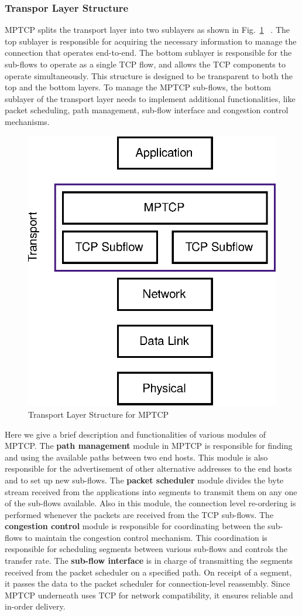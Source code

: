 \subsubsection{Transpor Layer Structure}

MPTCP splits the transport layer into two sublayers as shown in Fig.~\ref{fig:TransportLayerStructure} ~\cite{barreia2014multipath}. The top sublayer is responsible for acquiring the necessary information to manage the connection that operates end-to-end. The bottom sublayer is responsible for the sub-flows to operate as a single TCP flow, and allows the TCP components to operate simultaneously. This structure is designed to be transparent to both the top and the bottom layers. To manage the MPTCP sub-flows, the bottom sublayer of the transport layer needs to implement additional functionalities, like packet scheduling, path management, sub-flow interface and congestion control mechanisms.

\begin{figure}[!ht]
    \centering
    \includegraphics[width=.5\textwidth]{img/mptcp/mptcp_str}
    \caption{Transport Layer Structure for MPTCP~\cite{barreia2014multipath}}
    \label{fig:TransportLayerStructure}
\end{figure}

Here we give a brief description and functionalities of various modules of MPTCP. The \textbf{path management} module in MPTCP is responsible for finding and using the available paths between two end hosts. This module is also responsible for the advertisement of other alternative addresses to the end hosts and to set up new sub-flows.
The \textbf{packet scheduler} module divides the byte stream received from the applications into segments to transmit them on any one of the sub-flows available. Also in this module, the connection level re-ordering is performed whenever the packets are received from the TCP sub-flows. The \textbf{congestion control} module is responsible for coordinating between the sub-flows to maintain the congestion control mechanism. This coordination is responsible for scheduling segments between various sub-flows and controls the transfer rate. The \textbf{sub-flow interface} is in charge of transmitting the segments received from the packet scheduler on a specified path. On receipt of a segment, it passes the data to the packet scheduler for connection-level reassembly. Since MPTCP underneath uses TCP for network compatibility, it ensures reliable and in-order delivery.

